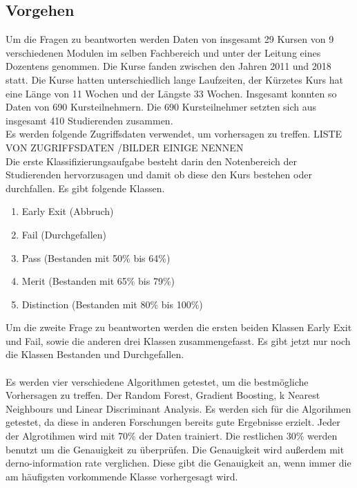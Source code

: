 \subsection{Vorgehen}
Um die Fragen zu beantworten werden Daten von insgesamt 29 Kursen von 9 verschiedenen Modulen im selben Fachbereich und unter der Leitung eines Dozentens genommen.
Die Kurse fanden zwischen den Jahren 2011 und 2018 statt. Die Kurse hatten unterschiedlich lange Laufzeiten, der Kürzetes Kurs hat eine Länge von 11 Wochen und der Längste 33 Wochen.
Insgesamt konnten so Daten von 690 Kursteilnehmern. Die 690 Kursteilnehmer setzten sich aus insgesamt 410 Studierenden zusammen. 
\\
Es werden folgende Zugriffsdaten verwendet, um vorhersagen zu treffen.
LISTE VON ZUGRIFFSDATEN /BILDER EINIGE NENNEN
\\
\noindent
Die erste Klassifizierungsaufgabe besteht darin den Notenbereich der Studierenden hervorzusagen und damit ob diese den Kurs bestehen oder durchfallen. Es gibt folgende Klassen.
\begin{enumerate}
    \item Early Exit (Abbruch)
    \item Fail (Durchgefallen)
    \item Pass (Bestanden mit 50\% bis 64\%)
    \item Merit (Bestanden mit 65\% bis 79\%)
    \item Distinction (Bestanden mit 80\% bis 100\%)
\end{enumerate}
Um die zweite Frage zu beantworten werden die ersten beiden Klassen Early Exit und Fail, sowie die anderen drei Klassen zusammengefasst.
Es gibt jetzt nur noch die Klassen Bestanden und Durchgefallen.
\\
\noindent
\\
\noindent
Es werden vier verschiedene Algorithmen getestet, um die bestmögliche Vorhersagen zu treffen. Der Random Forest, Gradient Boosting, k Nearest
Neighbours und Linear Discriminant Analysis. Es werden sich für die Algorihmen getestet, da diese in anderen Forschungen bereits gute Ergebnisse erzielt.
Jeder der Algrotihmen wird mit 70\% der Daten trainiert. Die restlichen 30\% werden benutzt um die Genauigkeit zu überprüfen.
Die Genauigkeit wird außerdem mit der\glqq no-information rate\grqq{} verglichen. Diese gibt die Genauigkeit an, wenn immer die am häufigsten vorkommende Klasse vorhergesagt wird. 

